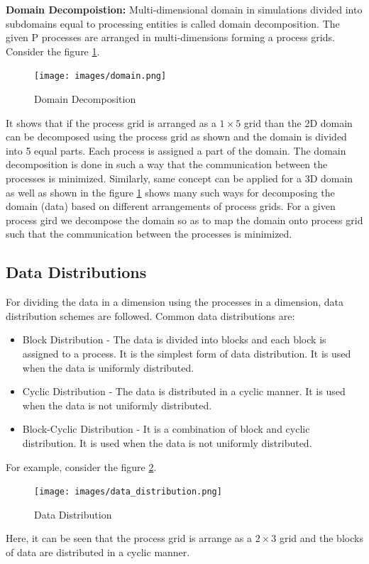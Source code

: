 \documentclass[12pt]{article}
\begin{document}
\textbf{Domain Decompoistion: }Multi-dimensional domain in simulations divided into subdomains equal to processing entities is called domain decomposition.
The given P processes are arranged in multi-dimensions forming a process grids. Consider the figure \ref{fig:domain}.
\begin{figure}[H]
    \centering
    \texttt{[image: images/domain.png]}
    \caption{Domain Decomposition}
    \label{fig:domain}
\end{figure}
It shows that if the process grid is arranged as a $1 \times 5$ grid than the 2D domain can be decomposed using the process grid as shown 
and the domain is divided into 5 equal parts. Each process is assigned a part of the domain. The domain decomposition is done in such a way that the communication between the processes is minimized.
Similarly, same concept can be applied for a 3D domain as well as shown in the figure \ref{fig:domain} shows many such ways for decomposing the domain (data) based on different arrangements of process grids.
For a given process gird we decompose the domain so as to map the domain onto process grid such that the communication between the processes is minimized.

\subsection{Data Distributions}
For dividing the data in a dimension using the processes in a dimension, data distribution schemes are followed. 
Common data distributions are:
\begin{itemize}
    \item Block Distribution - The data is divided into blocks and each block is assigned to a process. It is the simplest form of data distribution. It is used when the data is uniformly distributed.
    \item Cyclic Distribution - The data is distributed in a cyclic manner. It is used when the data is not uniformly distributed.
    \item Block-Cyclic Distribution - It is a combination of block and cyclic distribution. It is used when the data is not uniformly distributed.
\end{itemize}
For example, consider the figure \ref{fig:data_distribution}. 
\begin{figure}[H]
    \centering
    \texttt{[image: images/data\_distribution.png]}
    \caption{Data Distribution}
    \label{fig:data_distribution}
\end{figure}
Here, it can be seen that the process grid is arrange as a $2 \times 3$ grid and the blocks of data are distributed in a cyclic manner.
\end{document}
